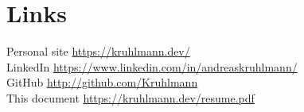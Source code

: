 \documentclass[a4paper,10pt]{article}
\begin{document}
\section{Links}
Personal site \href{https://kruhlmann.dev/}{https://kruhlmann.dev/}\\
LinkedIn \href{https://www.linkedin.com/in/andreaskruhlmann/}{https://www.linkedin.com/in/andreaskruhlmann/}\\
GitHub  \href{https://github.com/Kruhlmann}{http://github.com/Kruhlmann} \\
This document \href{https://kruhlmann.dev/resume.pdf}{https://kruhlmann.dev/resume.pdf}\\
\end{document}
